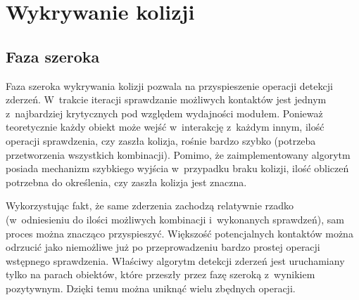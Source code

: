

\section{Wykrywanie kolizji}
\subsection{Faza szeroka}
Faza szeroka wykrywania kolizji pozwala na przyspieszenie operacji detekcji zderzeń. W~trakcie iteracji sprawdzanie możliwych kontaktów jest jednym z~najbardziej krytycznych pod względem wydajności modułem. Ponieważ teoretycznie każdy obiekt może wejść w~interakcję z~każdym innym, ilość operacji sprawdzenia, czy zaszła kolizja, rośnie bardzo szybko (potrzeba przetworzenia wszystkich kombinacji). Pomimo, że zaimplementowany algorytm posiada mechanizm szybkiego wyjścia w~przypadku braku kolizji, ilość obliczeń potrzebna do określenia, czy zaszła kolizja jest znaczna.

Wykorzystując fakt, że same zderzenia zachodzą relatywnie rzadko (w~odniesieniu do ilości możliwych kombinacji i~wykonanych sprawdzeń), sam proces można znacząco przyspieszyć. Większość potencjalnych kontaktów można odrzucić jako niemożliwe już po przeprowadzeniu bardzo prostej operacji wstępnego sprawdzenia. Właściwy algorytm detekcji zderzeń jest uruchamiany tylko na parach obiektów, które przeszły przez fazę szeroką z~wynikiem pozytywnym. Dzięki temu można uniknąć wielu zbędnych operacji.

